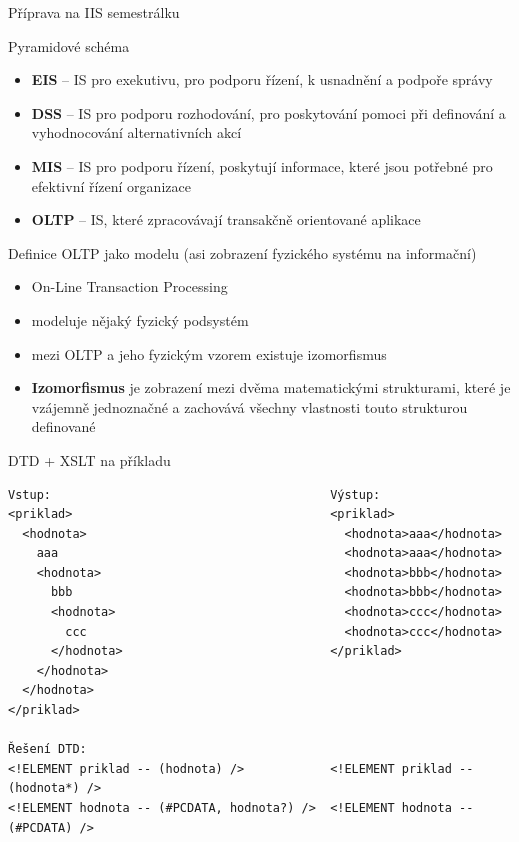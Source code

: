 \documentclass[12pt,a4paper,titlepage,final]{article}
\begin{document}
{ \huge Příprava na IIS semestrálku }

\begin{enumerate}
	{\large \item  Pyramidové schéma}
	\begin{itemize}
		\item \textbf{EIS} -- IS pro exekutivu, pro podporu řízení, k usnadnění a podpoře správy
		\item \textbf{DSS} -- IS pro podporu rozhodování, pro poskytování pomoci při definování a vyhodnocování alternativních akcí
		\item \textbf{MIS} -- IS pro podporu řízení, poskytují informace, které jsou potřebné pro efektivní řízení organizace
		\item \textbf{OLTP} -- IS, které zpracovávají transakčně orientované aplikace
	\end{itemize}
	
	
	{\large \item Definice OLTP jako modelu (asi zobrazení fyzického systému na informační)}
	\begin{itemize}
		\item On-Line Transaction Processing
		\item modeluje nějaký fyzický podsystém
		\item mezi OLTP a jeho fyzickým vzorem existuje izomorfismus
		\item \textbf{Izomorfismus} je zobrazení mezi dvěma matematickými strukturami, které je vzájemně jednoznačné a zachovává všechny vlastnosti touto strukturou definované
	\end{itemize}
	
	
	{\large \item DTD + XSLT na příkladu}
	\begin{verbatim}
Vstup:                                       Výstup:
<priklad>                                    <priklad>
  <hodnota>                                    <hodnota>aaa</hodnota>
    aaa                                        <hodnota>aaa</hodnota>
    <hodnota>                                  <hodnota>bbb</hodnota>
      bbb                                      <hodnota>bbb</hodnota>
      <hodnota>                                <hodnota>ccc</hodnota>
        ccc                                    <hodnota>ccc</hodnota>
      </hodnota>                             </priklad>
    </hodnota>
  </hodnota>
</priklad> 

Řešení DTD:	
<!ELEMENT priklad -- (hodnota) />            <!ELEMENT priklad -- (hodnota*) />
<!ELEMENT hodnota -- (#PCDATA, hodnota?) />  <!ELEMENT hodnota -- (#PCDATA) />


\end{verbatim}
\end{enumerate}
\end{document}
